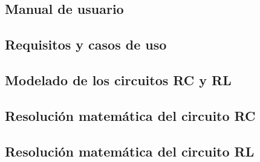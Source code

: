 \documentclass[12pt, a4paper, twoside]{article}
\begin{document}
\begin{umaappendices}
  \section{Manual de  usuario}
  
\end{umaappendices}

\begin{umaappendices}
  \section{Requisitos y casos de uso}
  
\end{umaappendices}


\begin{umaappendices}
  \section{Modelado de los circuitos RC y RL}
  
\end{umaappendices}

\begin{umaappendices}
  \section{Resolución matemática del circuito RC}
  
\end{umaappendices}

\begin{umaappendices}
  \section{Resolución matemática del circuito RL}
  
\end{umaappendices}




\end{document}
